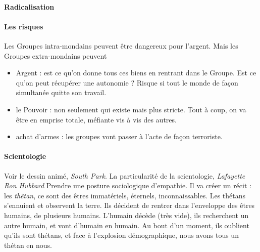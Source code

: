 \paragraph{Radicalisation} 

\paragraph{Les risques} Les Groupes intra-mondains peuvent être dangereux pour l'argent. Mais les Groupes extra-mondains peuvent 
\begin{itemize}
    \item Argent : est ce qu'on donne tous ces biens en rentrant dans le Groupe. Est ce qu'on peut récupérer une autonomie ? Risque si tout le monde de façon simultanée quitte son travail.
    \item le Pouvoir : non seulement qui existe mais plus stricte. Tout à coup, on va être en emprise totale, méfiante vis à vis des autres. 
    \item achat d'armes : les groupes vont passer à l'acte de façon terroriste.
\end{itemize}


\paragraph{Scientologie} Voir le dessin animé, \textit{South Park}. La particularité de la scientologie, \textit{Lafayette Ron Hubbard} Prendre une posture sociologique d'empathie. Il va créer un récit : les \textit{thêtan}, ce sont des êtres immatériels, éternels, inconnaissables. Les thétans s'ennuient et observent la terre. Ils décident de rentrer dans l'enveloppe des êtres humains, de plusieurs humains. L'humain décède (très vide), ils recherchent un autre humain, et vont d'humain en humain. Au bout d'un moment, ils oublient qu'ils sont thétans, et face à l'explosion démographique, nous avons tous un thétan en nous. 

